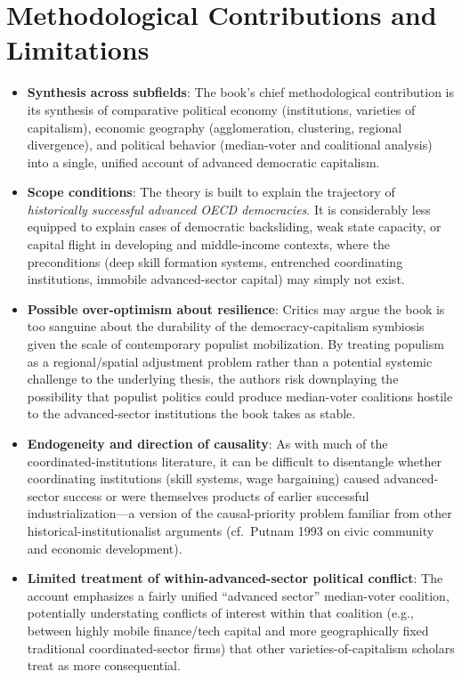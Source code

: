 \documentclass[12pt]{article}
\begin{document}
\section{Methodological Contributions and Limitations}

\begin{itemize}[leftmargin=*, itemsep=4pt]
    \item \textbf{Synthesis across subfields}: The book's chief methodological contribution is its synthesis of comparative political economy (institutions, varieties of capitalism), economic geography (agglomeration, clustering, regional divergence), and political behavior (median-voter and coalitional analysis) into a single, unified account of advanced democratic capitalism.
    \item \textbf{Scope conditions}: The theory is built to explain the trajectory of \textit{historically successful advanced OECD democracies}. It is considerably less equipped to explain cases of democratic backsliding, weak state capacity, or capital flight in developing and middle-income contexts, where the preconditions (deep skill formation systems, entrenched coordinating institutions, immobile advanced-sector capital) may simply not exist.
    \item \textbf{Possible over-optimism about resilience}: Critics may argue the book is too sanguine about the durability of the democracy-capitalism symbiosis given the scale of contemporary populist mobilization. By treating populism as a regional/spatial adjustment problem rather than a potential systemic challenge to the underlying thesis, the authors risk downplaying the possibility that populist politics could produce median-voter coalitions hostile to the advanced-sector institutions the book takes as stable.
    \item \textbf{Endogeneity and direction of causality}: As with much of the coordinated-institutions literature, it can be difficult to disentangle whether coordinating institutions (skill systems, wage bargaining) caused advanced-sector success or were themselves products of earlier successful industrialization---a version of the causal-priority problem familiar from other historical-institutionalist arguments (cf.\ Putnam 1993 on civic community and economic development).
    \item \textbf{Limited treatment of within-advanced-sector political conflict}: The account emphasizes a fairly unified ``advanced sector'' median-voter coalition, potentially understating conflicts of interest within that coalition (e.g., between highly mobile finance/tech capital and more geographically fixed traditional coordinated-sector firms) that other varieties-of-capitalism scholars treat as more consequential.
\end{itemize}
\end{document}
